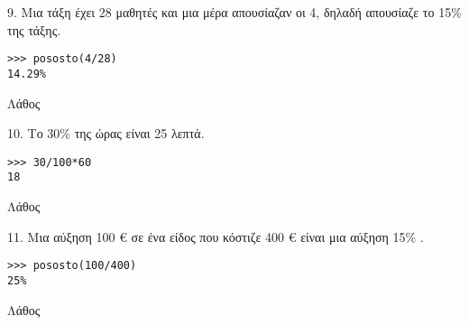 \begin{exercise}
9. Μια τάξη έχει 28 μαθητές και μια μέρα απουσίαζαν οι 4, δηλαδή
απουσίαζε το 15\% της τάξης.
\end{exercise}
\begin{lstlisting}
>>> pososto(4/28)
14.29%
\end{lstlisting}
Λάθος
\begin{exercise}
10. Το 30\% της ώρας είναι 25 λεπτά.
\end{exercise}
\begin{lstlisting}
>>> 30/100*60
18
\end{lstlisting}
Λάθος

\begin{exercise}
11. Μια αύξηση 100 € σε ένα είδος που κόστιζε 400 € είναι μια αύξηση 15\% .
\end{exercise}
\begin{lstlisting}
>>> pososto(100/400)
25%
\end{lstlisting}
Λάθος
